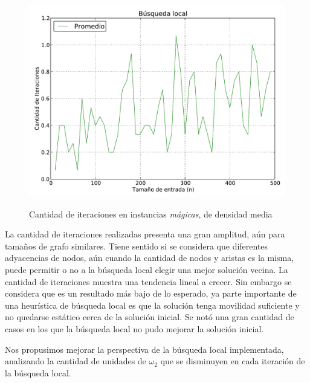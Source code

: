 \begin{figure}[H]
\begin{center}
\includegraphics[angle=0, scale=.70]{imagenes/local-iteraciones.pdf}
\label{grafico local}
\caption{Cantidad de iteraciones en instancias \textit{mágicas}, de densidad media}
\end{center}
\end{figure}

La cantidad de iteraciones realizadas presenta una gran amplitud, aún para tamaños de grafo similares. Tiene sentido si se considera que diferentes adyacencias de nodos, aún cuando la cantidad de nodos y aristas es la misma, puede permitir o no a la búsqueda local elegir una mejor solución vecina. La cantidad de iteraciones muestra una tendencia lineal a crecer. Sin embargo se considera que es un resultado más bajo de lo esperado, ya  parte importante de una heurística de búsqueda local es que la solución tenga movilidad suficiente y no quedarse estático cerca de la solución inicial. Se notó una gran cantidad de casos en los que la búsqueda local no pudo mejorar la solución inicial.

Nos propusimos mejorar la perspectiva de la búsqueda local implementada, analizando la cantidad de unidades de $\omega_2$ que se disminuyen en cada iteración de la búsqueda local. 

